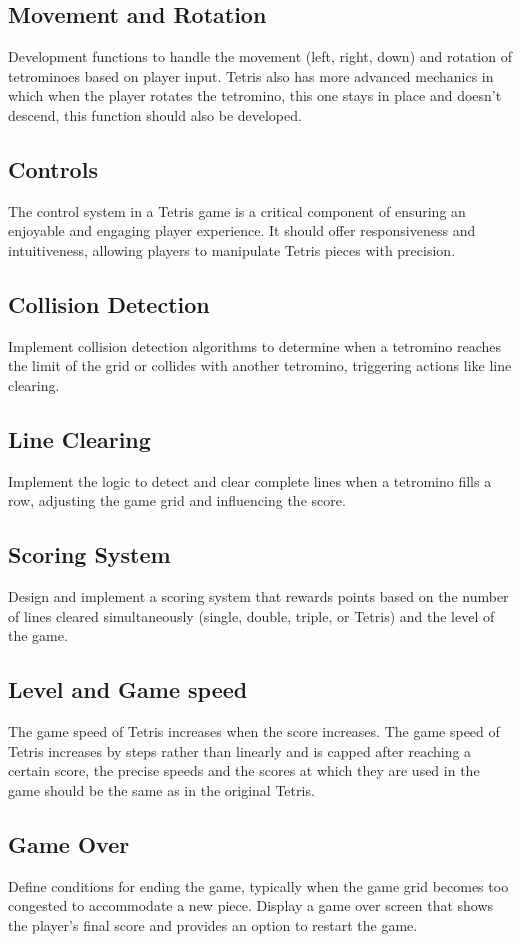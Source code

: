 \documentclass[conference]{IEEEtran}
\begin{document}
\subsection{Movement and Rotation}
Development functions to handle the movement (left, right, down) and rotation of tetrominoes based on player input. Tetris also has more advanced mechanics in which when the player rotates the tetromino, this one stays in place and doesn’t descend, this function should also be developed.
\subsection{Controls}
The control system in a Tetris game is a critical component of ensuring an enjoyable and engaging player experience. It should offer responsiveness and intuitiveness, allowing players to manipulate Tetris pieces with precision.
\subsection{Collision Detection}
Implement collision detection algorithms to determine when a tetromino reaches the limit of the grid or collides with another tetromino, triggering actions like line clearing.
\subsection{Line Clearing}
Implement the logic to detect and clear complete lines when a tetromino fills a row, adjusting the game grid and influencing the score.
\subsection{Scoring System}
Design and implement a scoring system that rewards points based on the number of lines cleared simultaneously (single, double, triple, or Tetris) and the level of the game.
\subsection{Level and Game speed}
The game speed of Tetris increases when the score increases. The game speed of Tetris increases by steps rather than linearly and is capped after reaching a certain score, the precise speeds and the scores at which they are used in the game should be the same as in the original Tetris.
\subsection{Game Over}
Define conditions for ending the game, typically when the game grid becomes too congested to accommodate a new piece. Display a game over screen that shows the player's final score and provides an option to restart the game.
\end{document}
